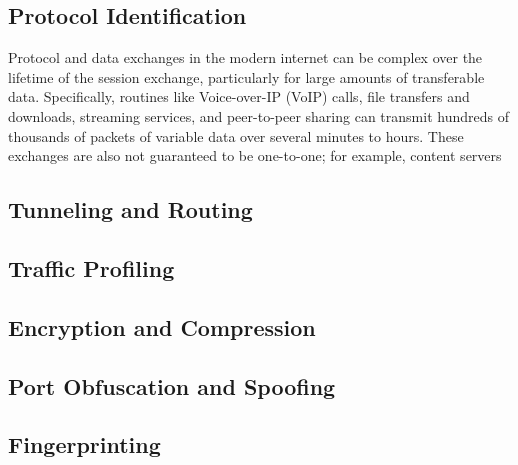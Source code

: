 \subsection{Protocol Identification}

Protocol and data exchanges in the modern internet can be complex over the lifetime of the session exchange, particularly for large amounts of transferable data. Specifically, routines like Voice-over-IP (VoIP) calls, file transfers and downloads, streaming services, and peer-to-peer sharing can transmit hundreds of thousands of packets of variable data over several minutes to hours. These exchanges are also not guaranteed to be one-to-one; for example, content servers


\subsection{Tunneling and Routing}
\subsection{Traffic Profiling}
\subsection{Encryption and Compression}
\subsection{Port Obfuscation and Spoofing}
\subsection{Fingerprinting}
